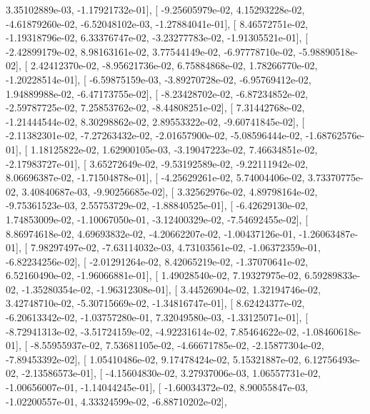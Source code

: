 \documentclass{article}
\begin{document}
          3.35102889e-03,  -1.17921732e-01],
       [ -9.25605979e-02,   4.15293228e-02,  -4.61879260e-02,
         -6.52048102e-03,  -1.27884041e-01],
       [  8.46572751e-02,  -1.19318796e-02,   6.33376747e-02,
         -3.23277783e-02,  -1.91305521e-01],
       [ -2.42899179e-02,   8.98163161e-02,   3.77544149e-02,
         -6.97778710e-02,  -5.98890518e-02],
       [  2.42412370e-02,  -8.95621736e-02,   6.75884868e-02,
          1.78266770e-02,  -1.20228514e-01],
       [ -6.59875159e-03,  -3.89270728e-02,  -6.95769412e-02,
          1.94889988e-02,  -6.47173755e-02],
       [ -8.23428702e-02,  -6.87234852e-02,  -2.59787725e-02,
          7.25853762e-02,  -8.44808251e-02],
       [  7.31442768e-02,  -1.21444544e-02,   8.30298862e-02,
          2.89553322e-02,  -9.60741845e-02],
       [ -2.11382301e-02,  -7.27263432e-02,  -2.01657900e-02,
         -5.08596444e-02,  -1.68762576e-01],
       [  1.18125822e-02,   1.62900105e-03,  -3.19047223e-02,
          7.46634851e-02,  -2.17983727e-01],
       [  3.65272649e-02,  -9.53192589e-02,  -9.22111942e-02,
          8.06696387e-02,  -1.71504878e-01],
       [ -4.25629261e-02,   5.74004406e-02,   3.73370775e-02,
          3.40840687e-03,  -9.90256685e-02],
       [  3.32562976e-02,   4.89798164e-02,  -9.75361523e-03,
          2.55753729e-02,  -1.88840525e-01],
       [ -6.42629130e-02,   1.74853009e-02,  -1.10067050e-01,
         -3.12400329e-02,  -7.54692455e-02],
       [  8.86974618e-02,   4.69693832e-02,  -4.20662207e-02,
         -1.00437126e-01,  -1.26063487e-01],
       [  7.98297497e-02,  -7.63114032e-03,   4.73103561e-02,
         -1.06372359e-01,  -6.82234256e-02],
       [ -2.01291264e-02,   8.42065219e-02,  -1.37070641e-02,
          6.52160490e-02,  -1.96066881e-01],
       [  1.49028540e-02,   7.19327975e-02,   6.59289833e-02,
         -1.35280354e-02,  -1.96312308e-01],
       [  3.44526904e-02,   1.32194746e-02,   3.42748710e-02,
         -5.30715669e-02,  -1.34816747e-01],
       [  8.62424377e-02,  -6.20613342e-02,  -1.03757280e-01,
          7.32049580e-03,  -1.33125071e-01],
       [ -8.72941313e-02,  -3.51724159e-02,  -4.92231614e-02,
          7.85464622e-02,  -1.08460618e-01],
       [ -8.55955937e-02,   7.53681105e-02,  -4.66671785e-02,
         -2.15877304e-02,  -7.89453392e-02],
       [  1.05410486e-02,   9.17478424e-02,   5.15321887e-02,
          6.12756493e-02,  -2.13586573e-01],
       [ -4.15604830e-02,   3.27937006e-03,   1.06557731e-02,
         -1.00656007e-01,  -1.14044245e-01],
       [ -1.60034372e-02,   8.90055847e-03,  -1.02200557e-01,
          4.33324599e-02,  -6.88710202e-02],
\end{document}
